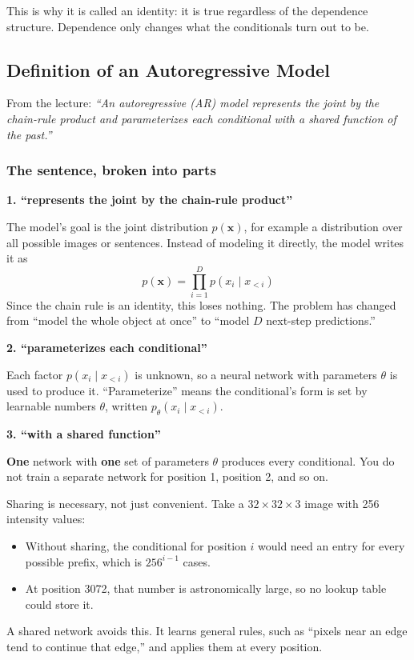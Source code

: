 This is why it is called an identity: it is true regardless of the dependence structure. Dependence only changes what the conditionals turn out to be.

\subsection*{Definition of an Autoregressive Model}

From the lecture: \textit{``An autoregressive (AR) model represents the joint by the chain-rule product and parameterizes each conditional with a shared function of the past.''}

\subsubsection*{The sentence, broken into parts}

\textbf{1. ``represents the joint by the chain-rule product''}

The model's goal is the joint distribution $p(\mathbf{x})$, for example a distribution over all possible images or sentences. Instead of modeling it directly, the model writes it as
\[
p(\mathbf{x}) = \prod_{i=1}^{D} p(x_i \mid x_{<i})
\]
Since the chain rule is an identity, this loses nothing. The problem has changed from ``model the whole object at once'' to ``model $D$ next-step predictions.''

\textbf{2. ``parameterizes each conditional''}

Each factor $p(x_i \mid x_{<i})$ is unknown, so a neural network with parameters $\theta$ is used to produce it. ``Parameterize'' means the conditional's form is set by learnable numbers $\theta$, written $p_\theta(x_i \mid x_{<i})$.

\textbf{3. ``with a shared function''}

\textbf{One} network with \textbf{one} set of parameters $\theta$ produces every conditional. You do not train a separate network for position 1, position 2, and so on.

Sharing is necessary, not just convenient. Take a $32 \times 32 \times 3$ image with 256 intensity values:
\begin{itemize}
  \item Without sharing, the conditional for position $i$ would need an entry for every possible prefix, which is $256^{i-1}$ cases.
  \item At position 3072, that number is astronomically large, so no lookup table could store it.
\end{itemize}
A shared network avoids this. It learns general rules, such as ``pixels near an edge tend to continue that edge,'' and applies them at every position.

